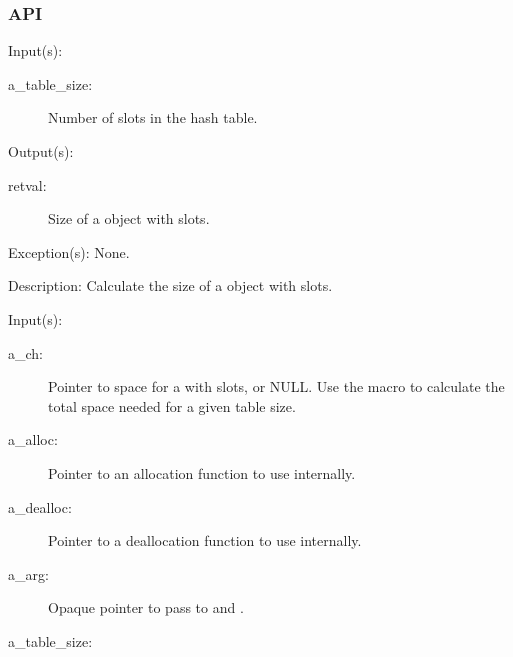 \subsubsection{API}
\begin{capi}
\label{CW_CH_TABLE2SIZEOF}
	\begin{capilist}
	\item[Input(s): ]
		\begin{description}\item[]
		\item[a\_table\_size: ]
			Number of slots in the hash table.
		\end{description}
	\item[Output(s): ]
		\begin{description}\item[]
		\item[retval: ]
			Size of a  object with
			 slots.
		\end{description}
	\item[Exception(s): ] None.
	\item[Description: ]
		Calculate the size of a  object with
		 slots.
	\end{capilist}
\label{ch_new}
	\begin{capilist}
	\item[Input(s): ]
		\begin{description}\item[]
		\item[a\_ch: ]
			Pointer to space for a \classname{ch} with
			 slots, or NULL.  Use the
			 macro to calculate
			the total space needed for a given table size.
		\item[a\_alloc: ]
			Pointer to an allocation function to use internally.
		\item[a\_dealloc: ]
			Pointer to a deallocation function to use internally.
		\item[a\_arg: ]
			Opaque pointer to pass to \cfunc{a\_alloc}{} and
			\cfunc{a\_dealloc}{}.
		\item[a\_table\_size: ]

\end{description}
\end{capilist}
\end{capi}
